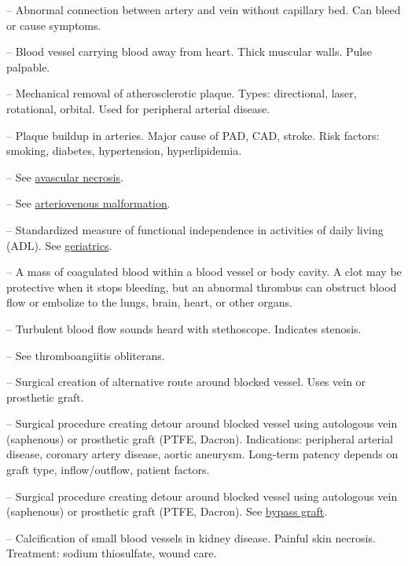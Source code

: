 -- Abnormal connection between artery and vein without capillary bed. Can bleed or cause symptoms.

-- Blood vessel carrying blood away from heart. Thick muscular walls. Pulse palpable.

-- Mechanical removal of atherosclerotic plaque. Types: directional, laser, rotational, orbital. Used for peripheral arterial disease.

-- Plaque buildup in arteries. Major cause of PAD, CAD, stroke. Risk factors: smoking, diabetes, hypertension, hyperlipidemia.

-- See \hyperlink{Avascular Necrosis}{avascular necrosis}.

-- See \hyperlink{Arteriovenous Malformation}{arteriovenous malformation}.

-- Standardized measure of functional independence in activities of daily living (ADL). See \hyperlink{Geriatrics}{geriatrics}.

-- A mass of coagulated blood within a blood vessel or body cavity. A clot may be protective when it stops bleeding, but an abnormal thrombus can obstruct blood flow or embolize to the lungs, brain, heart, or other organs.

-- Turbulent blood flow sounds heard with stethoscope. Indicates stenosis.

-- See thromboangiitis obliterans.

-- Surgical creation of alternative route around blocked vessel. Uses vein or prosthetic graft.

-- Surgical procedure creating detour around blocked vessel using autologous vein (saphenous) or prosthetic graft (PTFE, Dacron). Indications: peripheral arterial disease, coronary artery disease, aortic aneurysm. Long-term patency depends on graft type, inflow/outflow, patient factors.

-- Surgical procedure creating detour around blocked vessel using autologous vein (saphenous) or prosthetic graft (PTFE, Dacron). See \hyperlink{Bypass Graft}{bypass graft}.

-- Calcification of small blood vessels in kidney disease. Painful skin necrosis. Treatment: sodium thiosulfate, wound care.

